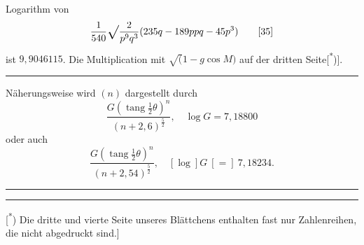\noindent\hspace*{\parindent}Logarithm von
\begin{equation}\frac1{540}\vsroot{\frac2{p^9q^3}}(235q-189ppq-45p^3)\tag*{[35]}\end{equation}
\noindent ist \(9{,}9046115\). Die Multiplication mit \(\surd(1-g\cos M)\) auf der dritten Seite[\textsuperscript{*})].
\begin{center}\rule{.24\linewidth}{.4pt}\end{center}
\noindent\hspace*{\parindent}Näherungsweise wird \((n)\) dargestellt durch
\[\frac{G(\operatorname{tang}\frac12\theta)^n}{(n+2{,}6)^{\frac52}},\quad \log G=7{,}18800\]
\noindent oder auch
\[\frac{G(\operatorname{tang}\frac12\theta)^n}{(n+2{,}54)^{\frac52}},\quad [\log]G\ [=]\ 7{,}18234.\]
\begin{center}\rule{.24\linewidth}{.4pt}\end{center}
\par\vfill\noindent\rule{.25\linewidth}{.4pt}\par\smallskip
{\footnotesize\noindent\hspace*{\parindent}[\textsuperscript{*}) Die dritte und vierte Seite unseres Blättchens enthalten fast nur Zahlenreihen, die nicht abgedruckt sind.]\par}
\clearpage\endgroup

